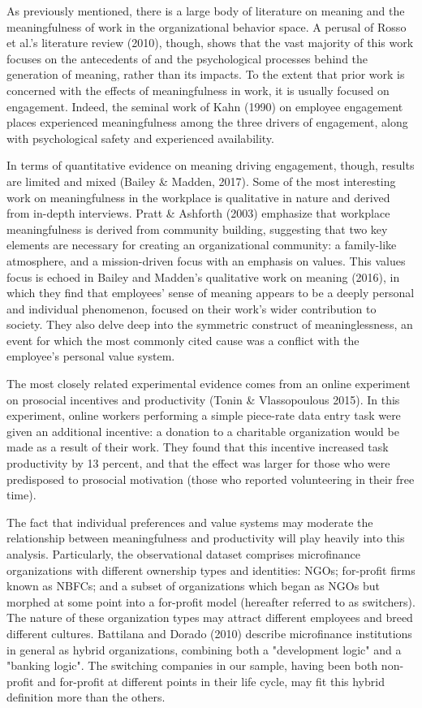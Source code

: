 \documentclass[12pt]{article}
\begin{document}
As previously mentioned, there is a large body of literature on meaning and the meaningfulness of work in the organizational behavior space. A perusal of Rosso et al.'s literature review (2010), though, shows that the vast majority of this work focuses on the antecedents of and the psychological processes behind the generation of meaning, rather than its impacts. To the extent that prior work is concerned with the effects of meaningfulness in work, it is usually focused on engagement. Indeed, the seminal work of Kahn (1990) on employee engagement places experienced meaningfulness among the three drivers of engagement, along with psychological safety and experienced availability.

In terms of quantitative evidence on meaning driving engagement, though, results are limited and mixed (Bailey \& Madden, 2017). Some of the most interesting work on meaningfulness in the workplace is qualitative in nature and derived from in-depth interviews. Pratt \& Ashforth (2003) emphasize that workplace meaningfulness is derived from community building, suggesting that two key elements are necessary for creating an organizational community: a family-like atmosphere, and a mission-driven focus with an emphasis on values. This values focus is echoed in Bailey and Madden's qualitative work on meaning (2016), in which they find that employees' sense of meaning appears to be a deeply personal and individual phenomenon, focused on their work's wider contribution to society. They also delve deep into the symmetric construct of meaninglessness, an event for which the most commonly cited cause was a conflict with the employee's personal value system.

The most closely related experimental evidence comes from an online experiment on prosocial incentives and productivity (Tonin \& Vlassopoulous 2015). In this experiment, online workers performing a simple piece-rate data entry task were given an additional incentive: a donation to a charitable organization would be made as a result of their work. They found that this incentive increased task productivity by 13 percent, and that the effect was larger for those who were predisposed to prosocial motivation (those who reported volunteering in their free time). 

The fact that individual preferences and value systems may moderate the relationship between meaningfulness and productivity will play heavily into this analysis. Particularly, the observational dataset comprises microfinance organizations with different ownership types and identities: NGOs; for-profit firms known as NBFCs; and a subset of organizations which began as NGOs but morphed at some point into a for-profit model (hereafter referred to as switchers). The nature of these organization types may attract different employees and breed different cultures. Battilana and Dorado (2010) describe microfinance institutions in general as hybrid organizations, combining both a "development logic" and a "banking logic". The switching companies in our sample, having been both non-profit and for-profit at different points in their life cycle, may fit this hybrid definition more than the others. 
\end{document}
